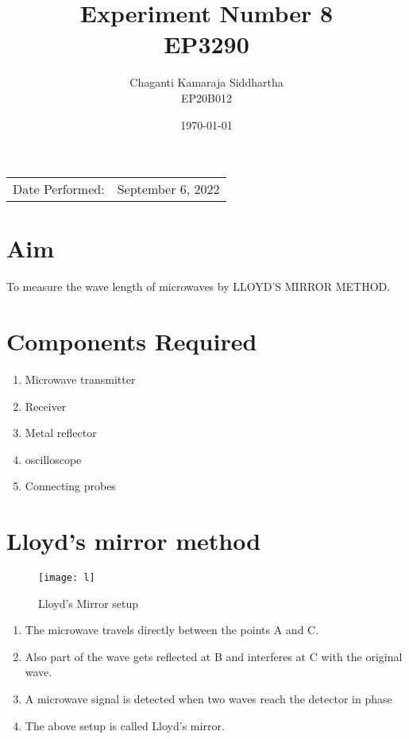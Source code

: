 \documentclass[
	letterpaper, %
	10pt, %
]{CSUniSchoolLabReport}
\title{Experiment Number 8\\ EP3290} %
\author{Chaganti Kamaraja Siddhartha\\EP20B012} %
\date{\today} %
\begin{document}
\maketitle %

\begin{center}
	\begin{tabular}{l r}
		Date Performed: & September 6, 2022 \\ %
	\end{tabular}
\end{center}


\section{Aim}
To measure the wave length of microwaves by LLOYD'S MIRROR METHOD. 
\section{Components Required}
\begin{enumerate}
	\item Microwave transmitter
	\item Receiver
	\item Metal reflector 
	\item oscilloscope
	\item Connecting probes
\end{enumerate}
\section{Lloyd's mirror method}
\begin{figure}[H] %
	\centering %
	\texttt{[image: l]} %
	\caption{Lloyd's Mirror setup}
\end{figure}
\begin{enumerate}
	\item The microwave travels directly between the points A and C. 
	\item Also part of the wave gets reflected at B and interferes at C with the original wave. 
	\item A microwave signal is detected when two waves reach the detector in phase
	\item The above setup is called Lloyd's mirror. 
\end{enumerate}
\end{document}
